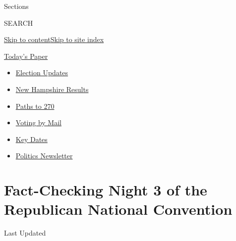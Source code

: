 Sections

SEARCH

\protect\hyperlink{site-content}{Skip to
content}\protect\hyperlink{site-index}{Skip to site index}

\href{https://myaccount.nytimes3xbfgragh.onion/auth/login?response_type=cookie\&client_id=vi}{}

\href{https://www.nytimes3xbfgragh.onion/section/todayspaper}{Today's
Paper}

\begin{itemize}
\item
  \href{https://www.nytimes3xbfgragh.onion/live/2020/09/09/us/trump-vs-biden?action=click\&pgtype=Article\&state=default\&region=TOP_BANNER\&context=storylines_menu}{Election
  Updates}
\item
  \href{https://www.nytimes3xbfgragh.onion/interactive/2020/09/08/us/elections/results-new-hampshire-primary-elections.html?action=click\&pgtype=Article\&state=default\&region=TOP_BANNER\&context=storylines_menu}{New
  Hampshire Results}
\item
  \href{https://www.nytimes3xbfgragh.onion/interactive/2020/us/elections/election-states-biden-trump.html?action=click\&pgtype=Article\&state=default\&region=TOP_BANNER\&context=storylines_menu}{Paths
  to 270}
\item
  \href{https://www.nytimes3xbfgragh.onion/interactive/2020/08/31/us/politics/vote-by-mail-deadlines.html?action=click\&pgtype=Article\&state=default\&region=TOP_BANNER\&context=storylines_menu}{Voting
  by Mail}
\item
  \href{https://www.nytimes3xbfgragh.onion/interactive/2019/us/elections/2020-presidential-election-calendar.html?action=click\&pgtype=Article\&state=default\&region=TOP_BANNER\&context=storylines_menu}{Key
  Dates}
\item
  \href{https://www.nytimes3xbfgragh.onion/newsletters/politics?action=click\&pgtype=Article\&state=default\&region=TOP_BANNER\&context=storylines_menu}{Politics
  Newsletter}
\end{itemize}

\hypertarget{fact-checking-night-3-of-the-republican-national-convention}{%
\section{Fact-Checking Night 3 of the Republican National
Convention}\label{fact-checking-night-3-of-the-republican-national-convention}}

Last Updated

